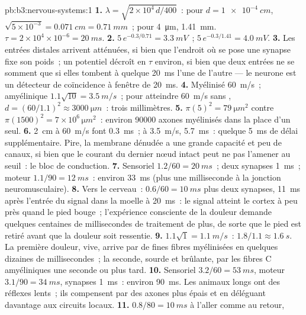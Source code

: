 \begin{solution}{pb:b3:nervous-systems:1}
\textbf{1.} $\lambda = \sqrt{2\times 10^{4}\,d/400}$~: pour $d =
\qty{1e-4}{cm}$, $\sqrt{5\times 10^{-3}} = \qty{0.071}{cm} =
\qty{0.71}{mm}$~; pour \qty{4}{\micro m}, \qty{1.41}{mm}. $\tau = 2\times
10^{4}\times 10^{-6} = \qty{20}{ms}$.
\textbf{2.} $5\,e^{-0.3/0.71} = \qty{3.3}{mV}$~; $5\,e^{-0.3/1.41} =
\qty{4.0}{mV}$.
\textbf{3.} Les entrées distales arrivent atténuées, si bien que
l'endroit où se pose une synapse fixe son poids~; un potentiel décroît
en $\tau$ environ, si bien que deux entrées ne se somment que si elles
tombent à quelque \qty{20}{ms} l'une de l'autre --- le neurone est un
détecteur de coïncidence à fenêtre de \qty{20}{ms}.
\textbf{4.} Myélinisé \qty{60}{m/s}~; amyélinique $1.1\sqrt{10} =
\qty{3.5}{m/s}$~; pour atteindre \qty{60}{m/s} sans , $d = (60/1.1)^{2}
\approx \qty{3000}{\micro m}$~: trois millimètres.
\textbf{5.} $\pi(5)^{2} = \qty{79}{\micro m^2}$ contre $\pi(1500)^{2} =
7\times 10^{6}\,\unit{\micro m^2}$~: environ \num{90000} axones
myélinisés dans la place d'un seul.
\textbf{6.} \qty{2}{cm} à \qty{60}{m/s} font \qty{0.3}{ms}~; à
\qty{3.5}{m/s}, \qty{5.7}{ms}~: quelque \qty{5}{ms} de délai
supplémentaire. Pire, la membrane dénudée a une grande capacité et peu
de canaux, si bien que le courant du dernier nœud intact peut ne pas
l'amener au seuil~: le bloc de conduction.
\textbf{7.} Sensoriel $1.2/60 = \qty{20}{ms}$~; deux synapses
\qty{1}{ms}~; moteur $1.1/90 = \qty{12}{ms}$~: environ \qty{33}{ms}
(plus une milliseconde à la jonction neuromusculaire).
\textbf{8.} Vers le cerveau~: $0.6/60 = \qty{10}{ms}$ plus deux synapses,
\qty{11}{ms} après l'entrée du signal dans la moelle à \qty{20}{ms}~: le
signal atteint le cortex à peu près quand le pied bouge~; l'expérience
consciente de la douleur demande quelques centaines de millisecondes de
traitement de plus, de sorte que le pied est retiré avant que la douleur
soit ressentie.
\textbf{9.} $1.1\sqrt{1} = \qty{1.1}{m/s}$~: $1.8/1.1 \approx
\qty{1.6}{s}$. La première douleur, vive, arrive par de fines fibres
myélinisées en quelques dizaines de millisecondes~; la seconde, sourde
et brûlante, par les fibres C amyéliniques une seconde ou plus tard.
\textbf{10.} Sensoriel $3.2/60 = \qty{53}{ms}$, moteur $3.1/90 =
\qty{34}{ms}$, synapses \qty{1}{ms}~: environ \qty{90}{ms}. Les animaux
longs ont des réflexes lents~; ils compensent par des axones plus épais
et en déléguant davantage aux circuits locaux.
\textbf{11.} $0.8/80 = \qty{10}{ms}$ à l'aller comme au retour,

\end{solution}
